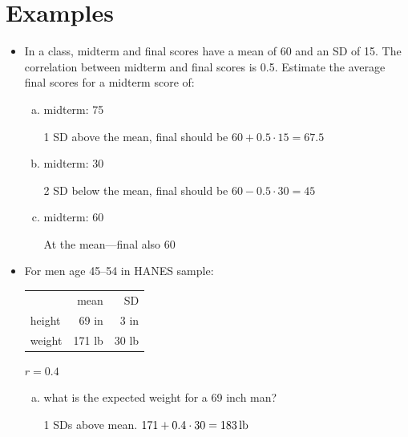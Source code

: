 \documentclass[letterpaper, landscape]{exam}
\begin{document}
  \section{Examples}
  \begin{itemize}
    \item In a class, midterm and final scores have a mean of 60 and an SD of 15.
      The correlation between midterm and final scores is 0.5.  Estimate the average
      final scores for a midterm score of:

      \begin{enumerate}[(a)]
        \item midterm: 75
          \begin{solution}
            1 SD above the mean, final should be $60 + 0.5 \cdot 15 = \boxed{
            67.5 }$
          \end{solution}

        \item midterm: 30
          \begin{solution}
            2 SD below the mean, final should be $60 - 0.5 \cdot 30 = \boxed{ 45
            }$
          \end{solution}
          
        \item midterm: 60
          \begin{solution}
            At the mean---final also 60
          \end{solution}
      \end{enumerate}

    \item For men age 45--54 in HANES sample:
      \begin{tabular}[H]{lrr}
               & mean   & SD \\
        height & 69 in  & 3 in \\
        weight & 171 lb & 30 lb \\
      \end{tabular}

      $r = 0.4$

      \begin{enumerate}[(a)]
      
        \item what is the expected weight for a 69 inch man?
        \begin{solution}
          1 SDs above mean.  $171 + 0.4 \cdot 30 = \unit[183]{lb}$
        \end{solution}


\end{enumerate}
\end{itemize}
\end{document}

